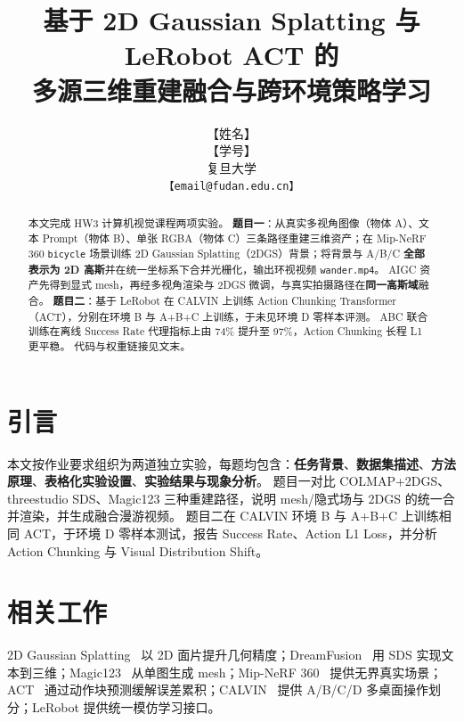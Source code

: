 \documentclass[10pt,twocolumn,letterpaper]{article}
\begin{document}
\title{基于 2D Gaussian Splatting 与 LeRobot ACT 的\\多源三维重建融合与跨环境策略学习}

\author{【姓名】\\
【学号】\\
复旦大学\\
{\tt\small 【email@fudan.edu.cn】}
}

\maketitle

\begin{abstract}
本文完成 HW3 计算机视觉课程两项实验。
\textbf{题目一}：从真实多视角图像（物体 A）、文本 Prompt（物体 B）、单张 RGBA（物体 C）三条路径重建三维资产；在 Mip-NeRF 360 \texttt{bicycle} 场景训练 2D Gaussian Splatting（2DGS）背景；将背景与 A/B/C \textbf{全部表示为 2D 高斯}并在统一坐标系下合并光栅化，输出环视视频 \texttt{wander.mp4}。
AIGC 资产先得到显式 mesh，再经多视角渲染与 2DGS 微调，与真实拍摄路径在\textbf{同一高斯域}融合。
\textbf{题目二}：基于 LeRobot 在 CALVIN 上训练 Action Chunking Transformer（ACT），分别在环境 B 与 A+B+C 上训练，于未见环境 D 零样本评测。
ABC 联合训练在离线 Success Rate 代理指标上由 74\% 提升至 97\%，Action Chunking 长程 L1 更平稳。
代码与权重链接见文末。
\end{abstract}

\section{引言}
\label{sec:intro}

本文按作业要求组织为两道独立实验，每题均包含：\textbf{任务背景}、\textbf{数据集描述}、\textbf{方法原理}、\textbf{表格化实验设置}、\textbf{实验结果与现象分析}。
题目一对比 COLMAP+2DGS、threestudio SDS、Magic123 三种重建路径，说明 mesh/隐式场与 2DGS 的统一合并渲染，并生成融合漫游视频。
题目二在 CALVIN 环境 B 与 A+B+C 上训练相同 ACT，于环境 D 零样本测试，报告 Success Rate、Action L1 Loss，并分析 Action Chunking 与 Visual Distribution Shift。

\section{相关工作}
\label{sec:related}

2D Gaussian Splatting~\cite{huang2024dgs} 以 2D 面片提升几何精度；DreamFusion~\cite{poole2023dreamfusion} 用 SDS 实现文本到三维；Magic123~\cite{qian2023magic123} 从单图生成 mesh；Mip-NeRF 360~\cite{barron2022mipnerf360} 提供无界真实场景；ACT~\cite{zhao2023act} 通过动作块预测缓解误差累积；CALVIN~\cite{mees2022calvin} 提供 A/B/C/D 多桌面操作划分；LeRobot 提供统一模仿学习接口。
\end{document}
